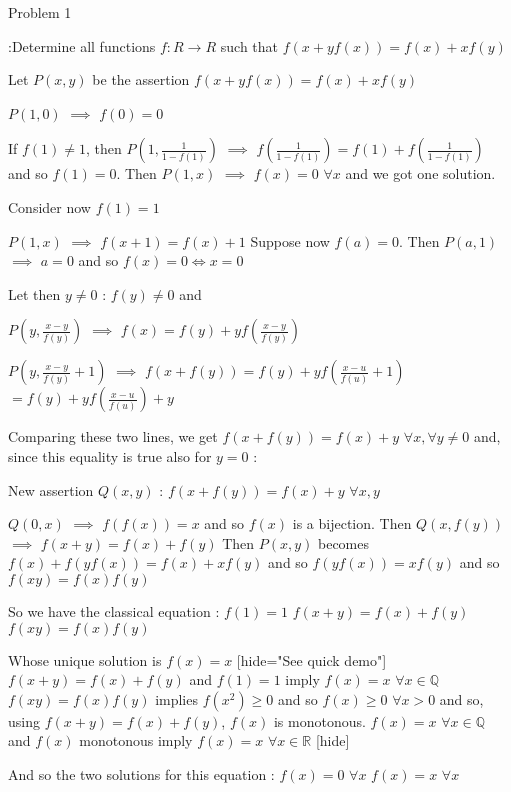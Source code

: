 \begin{solution}
	\begin{tcolorbox}\begin{bolded}Problem 1\end{bolded}:Determine all functions $ f: R \to R$ such that $ f(x + yf(x)) = f(x) + xf(y)$\end{tcolorbox}

Let $ P(x,y)$ be the assertion $ f(x + yf(x)) = f(x) + xf(y)$

$ P(1,0)$ $ \implies$ $ f(0) = 0$

If $ f(1)\neq 1$, then $ P(1,\frac 1{1 - f(1)})$ $ \implies$ $ f(\frac 1{1 - f(1)}) = f(1) + f(\frac 1{1 - f(1)})$ and so $ f(1) = 0$. Then $ P(1,x)$ $ \implies$ $ f(x) = 0$ $ \forall x$ and we got one solution.

Consider now $ f(1) = 1$

$ P(1,x)$ $ \implies$ $ f(x + 1) = f(x) + 1$
Suppose now $ f(a) = 0$. Then  $ P(a,1)$ $ \implies$ $ a = 0$ and so $ f(x) = 0\iff x = 0$

Let then $ y\neq 0$ : $ f(y)\neq 0$ and 

$ P(y,\frac {x - y}{f(y)})$ $ \implies$ $ f(x) = f(y) + yf(\frac {x - y}{f(y)})$

$ P(y,\frac {x - y}{f(y)} + 1)$ $ \implies$ $ f(x + f(y)) = f(y) + yf(\frac {x - u}{f(u)} + 1)$ $ = f(y) + yf(\frac {x - u}{f(u)}) + y$

Comparing these two lines, we get $ f(x + f(y)) = f(x) + y$ $ \forall x,\forall y\neq 0$ and, since this equality is true also for $ y = 0$ :

New assertion $ Q(x,y)$ : $ f(x + f(y)) = f(x) + y$ $ \forall x,y$

$ Q(0,x)$ $ \implies$ $ f(f(x)) = x$ and so $ f(x)$ is a bijection.
Then $ Q(x,f(y))$ $ \implies$ $ f(x + y) = f(x) + f(y)$
Then $ P(x,y)$ becomes $ f(x) + f(yf(x)) = f(x) + xf(y)$ and so $ f(yf(x)) = xf(y)$ and so $ f(xy) = f(x)f(y)$

So we have the classical equation :
$ f(1) = 1$
$ f(x + y) = f(x) + f(y)$
$ f(xy) = f(x)f(y)$

Whose unique solution is $ f(x) = x$
[hide="See quick demo"]
$ f(x + y) = f(x) + f(y)$ and $ f(1) = 1$ imply $ f(x) = x$ $ \forall x\in\mathbb Q$
$ f(xy) = f(x)f(y)$ implies $ f(x^2)\geq 0$ and so $ f(x)\geq 0$ $ \forall x > 0$ and so, using $ f(x + y) = f(x) + f(y)$, $ f(x)$ is monotonous.
$ f(x) = x$ $ \forall x\in\mathbb Q$ and $ f(x)$  monotonous imply $ f(x) = x$ $ \forall x\in\mathbb R$
[\/hide]

And so the two solutions for this equation :
$ f(x) = 0$ $ \forall x$
$ f(x) = x$ $ \forall x$
\end{solution}



